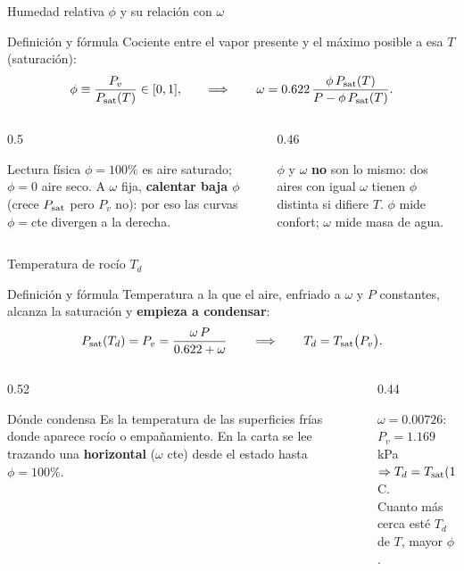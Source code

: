 \documentclass[aspectratio=169,10pt]{beamer}
\begin{document}
\begin{frame}{Humedad relativa $\phi$ y su relación con $\omega$}
\begin{cardidea}{Definición y fórmula}{\faSuperscript}
Cociente entre el vapor presente y el máximo posible a esa $T$ (saturación):
$$\phi \equiv \frac{P_v}{P_{\rm sat}(T)}\in[0,1],\qquad\Longrightarrow\qquad \omega = 0.622\,\frac{\phi\,P_{\rm sat}(T)}{P - \phi\,P_{\rm sat}(T)}.$$
\end{cardidea}
\vspace{1.6mm}
\begin{columns}[T]
\begin{column}{0.5\textwidth}
\begin{cardgear}{Lectura física}{\faInfoCircle}
$\phi=100\%$ es aire saturado; $\phi=0$ aire seco. A $\omega$ fija, \textbf{calentar baja $\phi$} (crece $P_{\rm sat}$ pero $P_v$ no): por eso las curvas $\phi=$cte divergen a la derecha.
\end{cardgear}
\end{column}
\begin{column}{0.46\textwidth}
\begin{cardnota}[\faExclamationTriangle]
$\phi$ y $\omega$ \textbf{no} son lo mismo: dos aires con igual $\omega$ tienen $\phi$ distinta si difiere $T$. $\phi$ mide confort; $\omega$ mide masa de agua.
\end{cardnota}
\end{column}
\end{columns}
\end{frame}

\begin{frame}{Temperatura de rocío $T_d$}
\begin{cardidea}{Definición y fórmula}{\faSuperscript}
Temperatura a la que el aire, enfriado a $\omega$ y $P$ constantes, alcanza la saturación y \textbf{empieza a condensar}:
$$P_{\rm sat}(T_d) = P_v = \frac{\omega\,P}{0.622+\omega}\qquad\Longrightarrow\qquad T_d = T_{\rm sat}\big(P_v\big).$$
\end{cardidea}
\vspace{1.6mm}
\begin{columns}[T]
\begin{column}{0.52\textwidth}
\begin{cardgear}{Dónde condensa}{\faInfoCircle}
Es la temperatura de las superficies frías donde aparece rocío o empañamiento. En la carta se lee trazando una \textbf{horizontal} ($\omega$ cte) desde el estado hasta $\phi=100\%$.
\end{cardgear}
\end{column}
\begin{column}{0.44\textwidth}
\begin{cardnota}[\faCalculator]
$\omega=0.00726$: $P_v=1.169$ kPa\\[0.5mm]
$\Rightarrow T_d=T_{\rm sat}(1.169)\approx 9.3\,^\circ$C.\\[0.5mm]
Cuanto más cerca esté $T_d$ de $T$, mayor $\phi$.
\end{cardnota}
\end{column}
\end{columns}
\end{frame}
\end{document}
